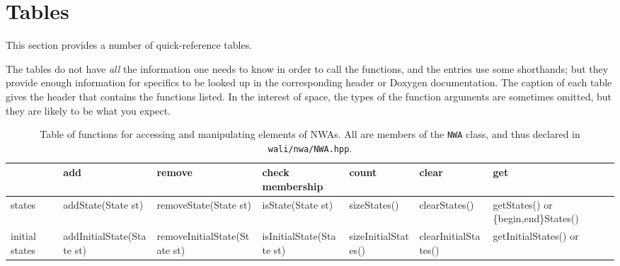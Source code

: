\section{Tables}
\label{Se:Tables}
This section provides a number of quick-reference tables.

The tables do not have \textsl{all} the information one needs to know in
order to call the functions, and the entries use some shorthands; but they
provide enough information for specifics to be looked up in the corresponding
header or Doxygen documentation. The caption of each table gives the header
that contains the functions listed. In the interest of space, the types of
the function arguments are sometimes omitted, but they are likely to be what you
expect.


\begin{sidewaystable}\sffamily\footnotesize
\begin{threeparttable}
\caption{\vbox{Table of functions for accessing and manipulating elements
  of NWAs. All are members of the \texttt{NWA} class, and thus declared in \texttt{wali/nwa/NWA.hpp}. }
}
\label{Ta:simple-functions}
\begin{tabular}{p{0.75in}p{1.55in}p{1.6in}p{1.35in}p{1.27in}p{1.2in}p{1.5in}}
\toprule
                 &  add\tnote{1}                            &  remove\tnote{1}                          &  check membership\tnote{3} &  count                &  clear                     &  get\tnote{4}                 \\
\hline\hline %
states           &  addState(State st)                      &  removeState(State st)\tnote{5}           &  isState(State st)         &  sizeStates()         &  clearStates()\tnote{5}    &  getStates() or \newline
                                                                                                                                                                                             \{begin,end\}States()        \\
initial \newline
states           &  addInitialState(State st)               &  removeInitialState(State st)             &  isInitialState(State st)  &  sizeInitialStates()  &  clearInitialStates()      &  getInitialStates() or \newline

\end{tabular}
\end{threeparttable}
\end{sidewaystable}
